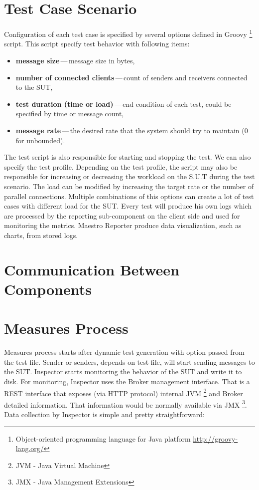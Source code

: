 \section{Test Case Scenario}
Configuration of each test case is specified by several options defined in Groovy \footnote{Object-oriented programming language for Java platform \url{http://groovy-lang.org/}} script. This script specify test behavior with following items:

\begin{itemize}
	\setlength\itemsep{0em}
	\item \textbf{message size}\,---\,message size in bytes,
	\item \textbf{number of connected clients}\,---\,count of senders and receivers connected to the SUT,
	\item \textbf{test duration (time or load)}\,---\,end condition of each test, could be specified by time or message count,
	\item \textbf{message rate}\,---\,the desired rate that the system should try to maintain (0 for unbounded).
\end{itemize}

The test script is also responsible for starting and stopping the test. We can also specify the test profile. Depending on the test profile, the script may also be responsible for increasing or decreasing the workload on the S.U.T during the test scenario. The load can be modified by increasing the target rate or the number of parallel connections. Multiple combinations of this options can create a lot of test cases with different load for the SUT. Every test will produce his own logs which are processed by the reporting sub-component on the client side and used for monitoring the metrics. Maestro Reporter produce data visualization, such as charts, from stored logs.

\section{Communication Between Components}
\label{Communication Between Components}

\section{Measures Process}
\label{Measures Process}
Measures process starts after dynamic test generation with option passed from the test file. Sender or senders, depends on test file, will start sending messages to the SUT. Inspector starts monitoring the behavior of the SUT and write it to disk. For monitoring, Inspector uses the Broker management interface. That is a REST interface that exposes (via HTTP protocol) internal JVM \footnote{JVM - Java Virtual Machine} and Broker detailed information. That information would be normally available via JMX \footnote{JMX - Java Management Extensions}. Data collection by Inspector is simple and pretty straightforward:

